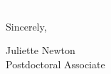 \documentclass[11pt]{article}
\begin{document}
\vspace{24pt}
\noindent
\begin{minipage}{0.99\textwidth}
\begin{minipage}{0.69\textwidth}
\textcolor{white}{.}
\end{minipage}
\begin{minipage}{0.29\textwidth}
Sincerely, 

\vspace{18pt}
Juliette Newton\\
Postdoctoral Associate\end{minipage}
\end{minipage}

\end{document}
